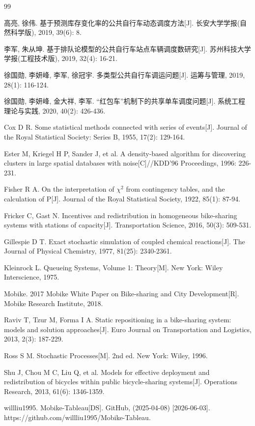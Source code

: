 \documentclass[12pt,a4paper]{article}
\begin{document}
\begin{thebibliography}{99}


高亮, 徐伟. 基于预测库存变化率的公共自行车动态调度方法[J]. 长安大学学报(自然科学版), 2019, 39(6): 8.

李军, 朱从坤. 基于排队论模型的公共自行车站点车辆调度数研究[J]. 苏州科技大学学报(工程技术版), 2019, 32(4): 16-21.

徐国勋, 李妍峰, 李军, 徐冠宇. 多类型公共自行车调运问题[J]. 运筹与管理, 2019, 28(1): 116-124.

徐国勋, 李妍峰, 金大祥, 李军. ``红包车''机制下的共享单车调度问题[J]. 系统工程理论与实践, 2020, 40(2): 426-436.


Cox D R. Some statistical methods connected with series of events[J]. Journal of the Royal Statistical Society: Series B, 1955, 17(2): 129-164.

Ester M, Kriegel H P, Sander J, et al. A density-based algorithm for discovering clusters in large spatial databases with noise[C]//KDD'96 Proceedings, 1996: 226-231.

Fisher R A. On the interpretation of $\chi^2$ from contingency tables, and the calculation of P[J]. Journal of the Royal Statistical Society, 1922, 85(1): 87-94.

Fricker C, Gast N. Incentives and redistribution in homogeneous bike-sharing systems with stations of capacity[J]. Transportation Science, 2016, 50(3): 509-531.

Gillespie D T. Exact stochastic simulation of coupled chemical reactions[J]. The Journal of Physical Chemistry, 1977, 81(25): 2340-2361.

Kleinrock L. Queueing Systems, Volume 1: Theory[M]. New York: Wiley Interscience, 1975.

Mobike. 2017 Mobike White Paper on Bike-sharing and City Development[R]. Mobike Research Institute, 2018.

Raviv T, Tzur M, Forma I A. Static repositioning in a bike-sharing system: models and solution approaches[J]. Euro Journal on Transportation and Logistics, 2013, 2(3): 187-229.

Ross S M. Stochastic Processes[M]. 2nd ed. New York: Wiley, 1996.

Shu J, Chou M C, Liu Q, et al. Models for effective deployment and redistribution of bicycles within public bicycle-sharing systems[J]. Operations Research, 2013, 61(6): 1346-1359.

willliu1995. Mobike-Tableau[DS]. GitHub, (2025-04-08) [2026-06-03]. https://github.com/willliu1995/Mobike-Tableau.

\end{thebibliography}
\end{document}
